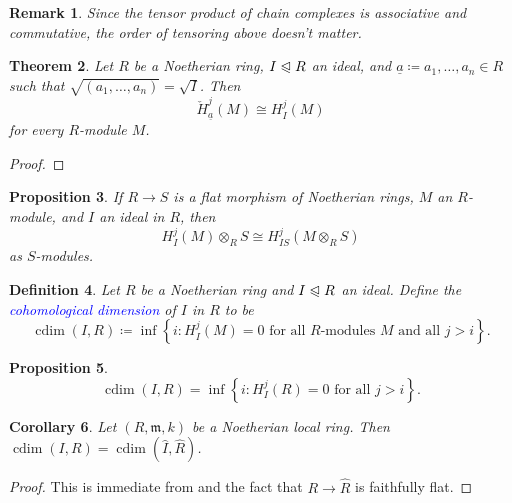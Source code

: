 \documentclass[10pt]{article}
\theoremstyle{thmstyle}
\newtheorem{theorem}{Theorem}[section]
\newtheorem{proposition}[theorem]{Proposition}
\theoremstyle{defstyle}
\newtheorem{definition}[theorem]{Definition}
\newtheorem{corollary}[theorem]{Corollary}
\newtheorem{remark}[theorem]{Remark}
\newcommand{\frakm}{\mathfrak{m}} %
\newcommand{\wh}[1]{\widehat{#1}}
\newcommand{\define}[1]{\textcolor{blue}{\textit{#1}}}
\newcommand{\noreq}{\trianglelefteqslant}
\newcommand{\ul}[1]{\underline{#1}}
\newcommand{\cech}[1]{\mathbin{\check{#1}}}
\newcommand{\cdim}{\operatorname{cdim}}
\begin{document}
\begin{remark}
	Since the tensor product of chain complexes is associative and commutative, the order of tensoring above doesn't matter. 
\end{remark}

\begin{theorem}
	Let $R$ be a Noetherian ring, $I\noreq R$ an ideal, and $\ul a\coloneq a_1,\dots, a_n\in R$ such that $\sqrt{(a_1,\dots ,a_n)} = \sqrt I$. Then 
	\begin{equation*}
		\cech{H}^j_{\ul a}(M)\cong  H^j_I(M)
	\end{equation*}
	for every $R$-module $M$.
\end{theorem}
\begin{proof}
	
\end{proof}

\begin{proposition}
	If $R\to S$ is a flat morphism of Noetherian rings, $M$ an $R$-module, and $I$ an ideal in $R$, then 
	\begin{equation*}
		H^j_I(M)\otimes_R S\cong H^j_{IS}(M\otimes_R S)
	\end{equation*}
	as $S$-modules.
\end{proposition}

\begin{definition}
	Let $R$ be a Noetherian ring and $I\noreq R$ an ideal. Define the \define{cohomological dimension} of $I$ in $R$ to be 
	\begin{equation*}
		\cdim(I, R)\coloneq\inf\left\{i\colon H^j_I(M) = 0\text{ for all $R$-modules $M$ and all $j > i$}\right\}.
	\end{equation*}
\end{definition}

\begin{proposition}
	\begin{equation*}
		\cdim(I, R) = \inf\left\{i\colon H^j_I(R) = 0 \text{ for all }j > i\right\}.
	\end{equation*}
\end{proposition}

\begin{corollary}
	Let $(R,\frakm, k)$ be a Noetherian local ring. Then $\cdim(I, R) = \cdim(\wh I,\wh R)$.
\end{corollary}
\begin{proof}
	This is immediate from  and the fact that $R\to\wh R$ is faithfully flat.
\end{proof}
\end{document}
